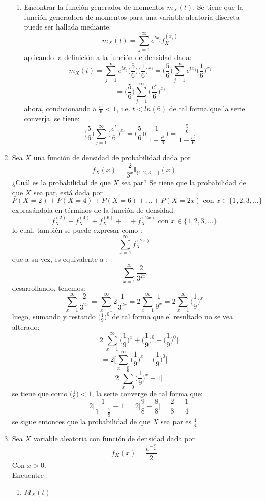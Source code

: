 \documentclass[12pt,a4paper]{report}
\begin{document}
\begin{enumerate}
{\begin{enumerate}
				\item {
					Encontrar la función generador de momentos $m_X(t)$.
				}
				\newline
				Se tiene que la función generadora de momentos para una variable
				aleatoria discreta puede ser hallada mediante:
					$$ m_X(t) = \sum_{j = 1}^{\infty} e^{tx_j} f_X^{(x_j)} $$
				aplicando la definición a la función de densidad dada:
					$$  m_X(t)
					 = \sum_{j = 1}^{\infty} e^{tx_j} \Big( \frac{5}{6} \Big)
					   \Big(\frac{1}{6}\Big)^{x_j}
					 = \Big( \frac{5}{6} \Big) \sum_{j = 1}^{\infty} e^{tx_j}
					   \Big(\frac{1}{6}\Big)^{x_j} $$
					$$ = \Big( \frac{5}{6} \Big) \sum_{j = 1}^{\infty}
					     \Big(\frac{e^t}{6}\Big)^{x_j} $$
				ahora, condicionando a $ \frac{e^t}{6} < 1 $, i.e. $ t < ln(6) $
				de tal forma que la serie converja, se tiene:
					$$ \Big( \frac{5}{6} \Big) \sum_{j = 1}^{\infty}
					     \Big(\frac{e^t}{6}\Big)^{x_j}
					 = \Big( \frac{5}{6} \Big)
					   \Big( \frac{1}{ 1 - \frac{e^t}{6}} \Big)
					 = \frac{\frac{5}{6}}{ 1 - \frac{e^t}{6}}$$
			\end{enumerate}
		}

		\item{
			Sea $X$ una función de densidad de probabilidad dada por
			\[f_X(x) = \frac{2}{3^x} \mathbb{I}_{\{1, 2, 3, ...\}}(x)\]
			¿Cuál es la probabilidad de que $X$ sea par?
		}
		Se tiene que la probabilidad de que $X$ sea par, está dada por
			$$ P(X = 2) + P(X = 4) + P(X = 6) + ... + P(X = 2x) \text{ con }
			   x \in \{1,2,3, ...\} $$
		exprasándola en términos de la función de densidad:
			$$ f_X^{(2)} + f_X^{(4)} + f_X^{(6)} + ... + f_X^{(2x)} \text{ con }
			   x \in \{1,2,3, ...\} $$
		lo cual, también se puede expresar como :
			$$ \sum_{x = 1}^{\infty} f_X^{(2x)} $$
		que a su vez, es equivalente a :
			$$ \sum_{x = 1}^{\infty} \frac{2}{3^{2x}} $$
		desarrollando, tenemos:
			$$ \sum_{x = 1}^{\infty} \frac{2}{3^{2x}}
			 = \sum_{x = 1}^{\infty} 2 \frac{1}{3^{2x}}
			 = 2 \sum_{x = 1}^{\infty} \frac{1}{9^x}
			 = 2 \sum_{x = 1}^{\infty} \Big( \frac{1}{9} \Big)^x $$
		luego, sumando y restando $ \Big( \frac{1}{9} \Big)^0  $ de tal forma
		que el resultado no se vea alterado:
			$$ = 2 \Big[ \sum_{x = 1}^{\infty} \Big( \frac{1}{9} \Big)^x
			   + \Big( \frac{1}{9} \Big)^0 - \Big( \frac{1}{9} \Big)^0 \Big] $$
			$$ = 2 \Big[  \sum_{x = 0}^{\infty} \Big( \frac{1}{9} \Big)^x
			   - \Big( \frac{1}{9} \Big)^0 \Big] $$
			$$ = 2 \Big[ \sum_{x = 0}^{\infty} \Big( \frac{1}{9} \Big)^x
			   - 1 \Big] $$
		se tiene que como $ \Big( \frac{1}{9} \Big) < 1 $, la serie converge de
		tal forma que:
			$$ = 2 \Big[ \frac{1}{1 - \frac{1}{9}} - 1 \Big]
			   = 2 \Big[ \frac{9}{8} - \frac{8}{8} \Big] = \frac{2}{8}
			   = \frac{1}{4}$$
		se sigue entonces que la probabilidad de que $X$ sea par es
		$\frac{1}{4}$.
		\item{
			Sea $X$ variable aleatoria con función de densidad dada por
			\[f_X(x) = \frac{e^{-\frac{x}{2}}}{2}\]
			Con $x > 0$.\\
			Encuentre
			\begin{enumerate}
				\item {
					$M_X(t)$
				}


\end{enumerate}}
\end{enumerate}
\end{document}
